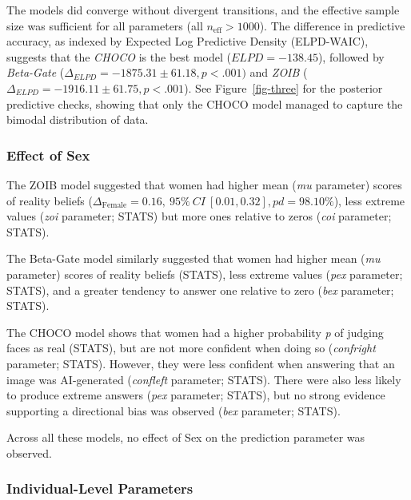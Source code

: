 \documentclass[
  jou,
  floatsintext,
  longtable,
  nolmodern,
  notxfonts,
  notimes,
  colorlinks=true,linkcolor=blue,citecolor=blue,urlcolor=blue]{apa7}
\begin{document}
The models did converge without divergent transitions, and the effective
sample size was sufficient for all parameters (all
\(n_{\text{eff}} > 1000\)). The difference in predictive accuracy, as
indexed by Expected Log Predictive Density (ELPD-WAIC), suggests that
the \emph{CHOCO} is the best model (\(ELPD = -138.45\)), followed by
\emph{Beta-Gate} (\(\Delta_{ELPD} = -1875.31 \pm 61.18, p < .001)\) and
\emph{ZOIB} (\(\Delta_{ELPD} = -1916.11 \pm 61.75, p < .001\)). See
Figure~\ref{fig-three} for the posterior predictive checks, showing that
only the CHOCO model managed to capture the bimodal distribution of
data.

\subsubsection{Effect of Sex}\label{effect-of-sex}

The ZOIB model suggested that women had higher mean (\emph{mu}
parameter) scores of reality beliefs
(\(\Delta_{\text{Female}} = 0.16,~95\%~ CI~[0.01, 0.32], pd = 98.10\%\)),
less extreme values (\emph{zoi} parameter; STATS) but more ones relative
to zeros (\emph{coi} parameter; STATS).

The Beta-Gate model similarly suggested that women had higher mean
(\emph{mu} parameter) scores of reality beliefs (STATS), less extreme
values (\emph{pex} parameter; STATS), and a greater tendency to answer
one relative to zero (\emph{bex} parameter; STATS).

The CHOCO model shows that women had a higher probability \emph{p} of
judging faces as real (STATS), but are not more confident when doing so
(\emph{confright} parameter; STATS). However, they were less confident
when answering that an image was AI-generated (\emph{confleft}
parameter; STATS). There were also less likely to produce extreme
answers (\emph{pex} parameter; STATS), but no strong evidence supporting
a directional bias was observed (\emph{bex} parameter; STATS).

Across all these models, no effect of Sex on the prediction parameter
was observed.

\subsubsection{Individual-Level
Parameters}\label{individual-level-parameters}
\end{document}

